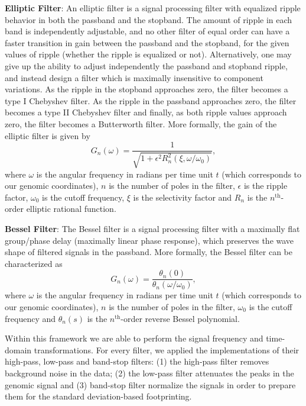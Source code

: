 \textbf{Elliptic Filter}: An elliptic filter is a signal processing filter with equalized ripple behavior in both the passband and the stopband. The amount of ripple in each band is independently adjustable, and no other filter of equal order can have a faster transition in gain between the passband and the stopband, for the given values of ripple (whether the ripple is equalized or not). Alternatively, one may give up the ability to adjust independently the passband and stopband ripple, and instead design a filter which is maximally insensitive to component variations. As the ripple in the stopband approaches zero, the filter becomes a type I Chebyshev filter. As the ripple in the passband approaches zero, the filter becomes a type II Chebyshev filter and finally, as both ripple values approach zero, the filter becomes a Butterworth filter. More formally, the gain of the elliptic filter is given by
\begin{equation}
  \label{eq:elliptic1}
  G_n(\omega)=\frac{1}{\sqrt{1+{ \epsilon^2 R_n^2(\xi,\omega/\omega_0)}}},
\end{equation}
where $ \omega $ is the angular frequency in radians per time unit $ t $ (which corresponds to our genomic coordinates), $n$ is the number of poles in the filter, $ \epsilon $ is the ripple factor, $ \omega_0 $ is the cutoff frequency, $ \xi $ is the selectivity factor and $ R_n $ is the $n^{\text{th}}$-order elliptic rational function.

\textbf{Bessel Filter}: The Bessel filter is a signal processing filter with a maximally flat group/phase delay (maximally linear phase response), which preserves the wave shape of filtered signals in the passband. More formally, the Bessel filter can be characterized as
\begin{equation}
  \label{eq:bessel1}
  G_n(\omega) = \frac{\theta_n(0)}{\theta_n(\omega/\omega_0)},
\end{equation}
where $ \omega $ is the angular frequency in radians per time unit $ t $ (which corresponds to our genomic coordinates), $n$ is the number of poles in the filter, $ \omega_0 $ is the cutoff frequency and $ \theta_n(s) $ is the $n^{\text{th}}$-order reverse Bessel polynomial.

Within this framework we are able to perform the signal frequency and time-domain transformations. For every filter, we applied the implementations of their high-pass, low-pass and band-stop filters: (1) the high-pass filter removes background noise in the data; (2) the low-pass filter attenuates the peaks in the genomic signal and (3) band-stop filter normalize the signals in order to prepare them for the standard deviation-based footprinting.

